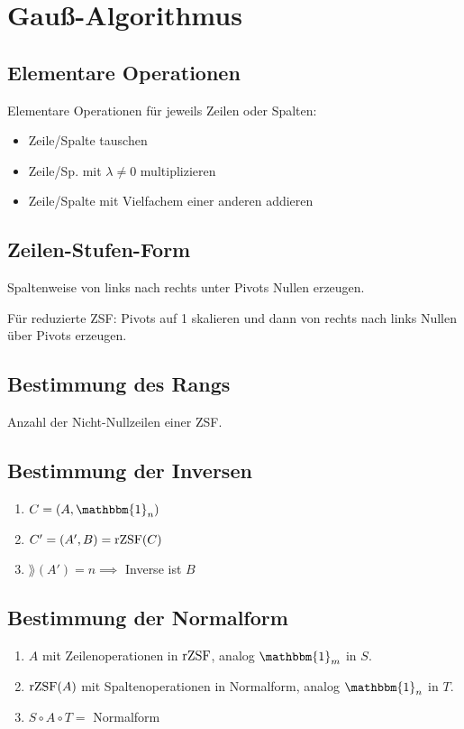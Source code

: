 \section*{Gauß-Algorithmus}

\subsection*{Elementare Operationen}
Elementare Operationen für jeweils Zeilen oder Spalten:
\begin{itemize}
	\item Zeile/Spalte tauschen
	\item Zeile/Sp. mit $\lambda\neq0$ multiplizieren
	\item Zeile/Spalte mit Vielfachem einer anderen addieren
\end{itemize}

\subsection*{Zeilen-Stufen-Form}
Spaltenweise von links nach rechts unter Pivots Nullen erzeugen.

Für reduzierte ZSF: Pivots auf 1 skalieren
und dann von rechts nach links Nullen über Pivots erzeugen.

\subsection*{Bestimmung des Rangs}
Anzahl der Nicht-Nullzeilen einer ZSF.

\subsection*{Bestimmung der Inversen}
\begin{enumerate}
	\item $C = (A, \mathbbm{1}_n)$
	\item $C'=(A',B)=\operatorname{rZSF}(C)$
	\item $\rang(A')=n \implies $ Inverse ist $B$
\end{enumerate}

\subsection*{Bestimmung der Normalform}
\begin{enumerate}
	\item $A$ mit Zeilenoperationen in $\operatorname{rZSF}$,
		analog $\mathbbm{1}_m$ in $S$.
	\item $\operatorname{rZSF}(A)$ mit Spaltenoperationen in Normalform,
		analog $\mathbbm{1}_n$ in $T$.
	\item $S \circ A \circ T = $ Normalform
\end{enumerate}

